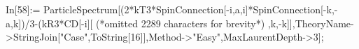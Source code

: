 In[58]:= ParticleSpectrum[(2*kT3*SpinConnection[-i,a,i]*SpinConnection[-k,-a,k])/3-(kR3*CD[-i][ (*omitted 2289 characters for brevity*) ,k,-k]],TheoryName->StringJoin["Case",ToString[16]],Method->"Easy",MaxLaurentDepth->3];
